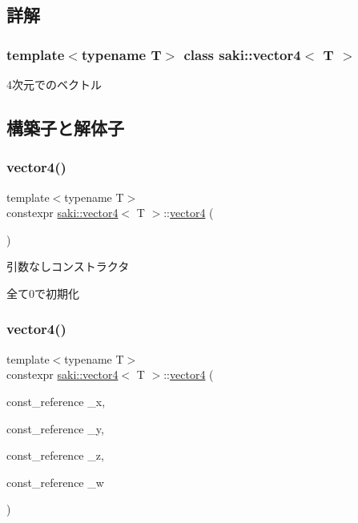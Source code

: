 \subsection{詳解}
\subsubsection*{template$<$typename T$>$\newline
class saki\+::vector4$<$ T $>$}

4次元でのベクトル 

\subsection{構築子と解体子}
\mbox{\label{classsaki_1_1vector4_a79dd4b2f31976d739dd7c6a3a799cd5b}} 
\subsubsection{\texorpdfstring{vector4()}{vector4()}\hspace{0.1cm}{\footnotesize\ttfamily [1/5]}}
{\footnotesize\ttfamily template$<$typename T$>$ \\
constexpr \mbox{\hyperlink{classsaki_1_1vector4}{saki\+::vector4}}$<$ T $>$\+::\mbox{\hyperlink{classsaki_1_1vector4}{vector4}} (\begin{DoxyParamCaption}{ }\end{DoxyParamCaption})\hspace{0.3cm}{\ttfamily [inline]}}



引数なしコンストラクタ 

全て0で初期化 \mbox{\label{classsaki_1_1vector4_a49fe2f8b17fc93ffb433fcceec620ae0}} 
\subsubsection{\texorpdfstring{vector4()}{vector4()}\hspace{0.1cm}{\footnotesize\ttfamily [2/5]}}
{\footnotesize\ttfamily template$<$typename T$>$ \\
constexpr \mbox{\hyperlink{classsaki_1_1vector4}{saki\+::vector4}}$<$ T $>$\+::\mbox{\hyperlink{classsaki_1_1vector4}{vector4}} (\begin{DoxyParamCaption}\item[{const\+\_\+reference}]{\+\_\+x,  }\item[{const\+\_\+reference}]{\+\_\+y,  }\item[{const\+\_\+reference}]{\+\_\+z,  }\item[{const\+\_\+reference}]{\+\_\+w }\end{DoxyParamCaption})\hspace{0.3cm}{\ttfamily [inline]}}



